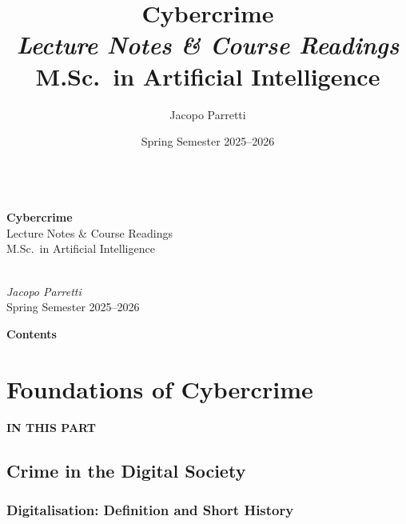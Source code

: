 \documentclass[11pt,a4paper,openany]{report}
\title{%
    \vspace*{1cm}
    {\Huge\bfseries Cybercrime}\\[0.6em]
    {\Large\itshape Lecture Notes \& Course Readings}\\[0.4em]
    {\large M.Sc.\ in Artificial Intelligence}
}
\author{Jacopo Parretti}
\date{Spring Semester 2025--2026}
\theoremstyle{definition}
\theoremstyle{plain}
\theoremstyle{remark}
\newcommand{\partmtoc}{%
  \vspace{2pt}{\color{rlrule}\rule{\linewidth}{0.5pt}}\par\vspace{3pt}%
  {\footnotesize\bfseries\color{rlaccent}IN THIS PART}\par\vspace{2pt}%
  \begingroup\etocsetnexttocdepth{section}\localtableofcontents\endgroup
  \vspace{2pt}{\color{rlrule}\rule{\linewidth}{0.5pt}}\par\vspace{8pt}}
\begin{document}
\begin{titlepage}
\centering
\thispagestyle{empty}
\vspace*{\fill}
\\[0.9cm]
{\fontsize{46}{52}\selectfont\bfseries\color{rlprimary} Cybercrime}\\[0.5cm]
{\LARGE\color{rlaccent} Lecture Notes \&{} Course Readings}\\[0.35cm]
{\large\color{rlprimary} M.Sc.\ in Artificial Intelligence}\\[0.8cm]
\\[1.3cm]
{\Large\itshape Jacopo Parretti}\\[0.4cm]
{\large\color{rlprimary} Spring Semester 2025--2026}
\vspace*{\fill}
\end{titlepage}

\thispagestyle{empty}
\begin{center}{\Huge\bfseries\color{rlprimary} Contents}\end{center}
\vspace{0.5cm}
\etocsettocstyle{}{}
\tableofcontents
\cleardoublepage
{}


\part{Foundations of Cybercrime}
\partmtoc

\chapter{Crime in the Digital Society}

\section{Digitalisation: Definition and Short History}
\end{document}
